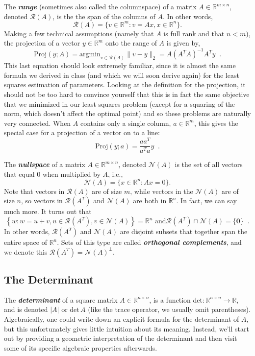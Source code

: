 \documentclass[12pt]{article}
\begin{document}
The \textbf{\textit{range}} (sometimes also called the columnspace)
of a matrix $A \in \mathbb{R}^{m \times n}$, denoted $\mathcal{R}(A)$,
is the the span of the columns of $A$.  In other words, 
\[\mathcal{R}(A) = \{v \in \mathbb{R}^m: v = Ax, x \in
\mathbb{R}^{n}\}.\]  Making a 
few technical assumptions (namely that $A$ is full rank and that $n <
m$), the projection of a vector $y \in \mathbb{R}^m$ onto the range of
$A$ is given by,
\[\mathrm{Proj}(y;A) = \mathrm{argmin}_{v \in \mathcal{R}(A)} \|v -
y\|_2 = A (A^T A)^{-1}A^T y\;\;.\]  This last equation should look
extremely familiar, since it is almost the same formula we derived in
class (and which we will soon derive again)
for the least squares estimation of parameters.  Looking at the
definition for the projection, it should not be too hard to convince
yourself that this is in fact the same objective that we minimized in
our least squares problem (except for a squaring of the norm, which
doesn't affect the optimal point) and so these problems are naturally
very connected.  When $A$ contains only a single column, $a \in
\mathbb{R}^m$, this gives the special case for a projection of a
vector on to a line: 
\[\mathrm{Proj}(y;a) = \frac{a a^T}{a^T a}y\;\;.\]

The \textbf{\textit{nullspace}} of a matrix $A \in \mathbb{R}^{m
  \times n}$, denoted $\mathcal{N}(A)$ is the set of all
  vectors that equal 0 when multiplied by $A$, i.e.,
\[\mathcal{N}(A) = \{x \in \mathbb{R}^n : Ax = 0\}.\]  Note that
vectors in $\mathcal{R}(A)$ are of size $m$, while vectors in the
$\mathcal{N}(A)$ are of size $n$, so vectors in $\mathcal{R}(A^T)$
and $\mathcal{N}(A)$ are both in $\mathbb{R}^n$.  In fact, we can
say much more.  It turns out that 
\[\left \{ w : w = u + v, u \in \mathcal{R}(A^T), v \in \mathcal{N}(A)
  \right \}  = \mathbb{R}^n \mbox{  and
} \mathcal{R}(A^T) \cap \mathcal{N}(A) = \{\mathbf{0}\}\;\;.\]
In other words, $\mathcal{R}(A^T)$ and $\mathcal{N}(A)$ are disjoint
subsets that together span the entire space of $\mathbb{R}^n$.  Sets
of this type are called \textbf{\textit{orthogonal complements}}, and
we denote this $\mathcal{R}(A^T) = \mathcal{N}(A)^\perp$.

\subsection{The Determinant}
The \textbf{\textit{determinant}} of a square matrix $A \in
\mathbb{R}^{n \times n}$, is a function $\mathrm{det} : \mathbb{R}^{n
  \times n} \rightarrow \mathbb{R}$, and is denoted $|A|$ or $\mathrm{det}\,A$
(like the trace operator, we usually omit parentheses).  
Algebraically,
one could write down an explicit formula for the determinant of $A$, but
this unfortunately gives little intuition about its meaning.  Instead,
we'll start out by providing a geometric interpretation of the determinant
and then visit some of its specific algebraic properties afterwards.
\end{document}
